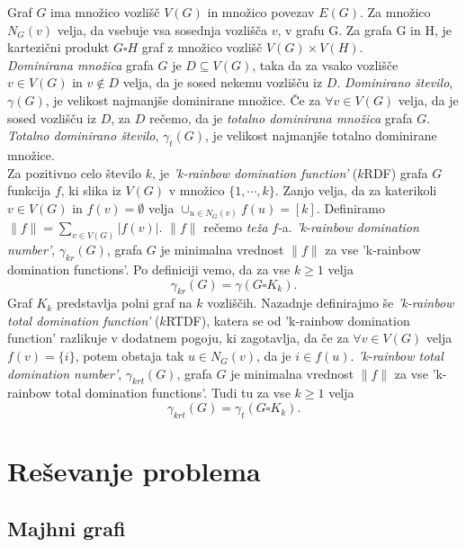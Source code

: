 \documentclass[a4paper]{article}
\begin{document}
Graf $G$ ima množico vozlišč $V(G)$ in množico povezav $E(G)$. Za množico $N_G(v)$ velja, da vsebuje vsa sosednja vozlišča $v$, v grafu G. Za grafa G in H, je kartezični produkt $G \square H$ graf z množico vozlišč $V(G) \times V(H)$.\\
\textit{Dominirana množica} grafa $G$ je $D \subseteq V(G)$, taka da za vsako vozlišče $v \in V(G)$ in $v \notin D$ velja, da je sosed nekemu vozlišču iz $D$. \textit{Dominirano število}, $\gamma(G)$, je velikost najmanjše dominirane množice. Če za $\forall v \in V(G)$ velja, da je sosed vozlišču iz $D$, za $D$ rečemo, da je \textit{totalno dominirana množica} grafa $G$. \textit{Totalno dominirano število}, $\gamma_{t}(G)$, je velikost najmanjše totalno dominirane množice.\\
Za pozitivno celo število $k$, je \textit{'k-rainbow domination function'} ($k$RDF) grafa $G$ funkcija $f$, ki slika iz $V(G)$ v množico $\{1, \cdots, k\}$. Zanjo velja, da za katerikoli $v \in V(G)$ in $f(v) = \emptyset$ velja $\cup_{u \in N_G(v)} f(u) = [k]$. Definiramo $\|f\| = \sum_{v \in V(G)}|f(v)|$. $\|f\|$ rečemo \textit{teža} $f$-a. \textit{'k-rainbow domination number'}, $\gamma_{kr}(G)$, grafa $G$ je minimalna vrednost $\|f\|$ za vse 'k-rainbow domination functions'. Po definiciji vemo, da za vse $k \geq 1$ velja $$\gamma_{kr}(G) = \gamma(G \square K_k).$$
Graf $K_k$ predstavlja polni graf na $k$ vozliščih. Nazadnje definirajmo še \textit{'k-rainbow total domination function'} ($k$RTDF), katera se od 'k-rainbow domination function' razlikuje v dodatnem pogoju, ki zagotavlja, da če za $\forall v \in V(G)$ velja $f(v) = \{i\}$, potem obstaja tak $u \in N_G(v)$, da je $i \in f(u)$. \textit{'k-rainbow total domination number'}, $\gamma_{krt}(G)$, grafa $G$ je minimalna vrednost $\|f\|$ za vse 'k-rainbow total domination functions'. Tudi tu za vse $k \geq 1$ velja $$\gamma_{krt}(G) = \gamma_t(G \square K_k).$$
\pagebreak

\section{Reševanje problema}

\subsection{Majhni grafi}
\end{document}
